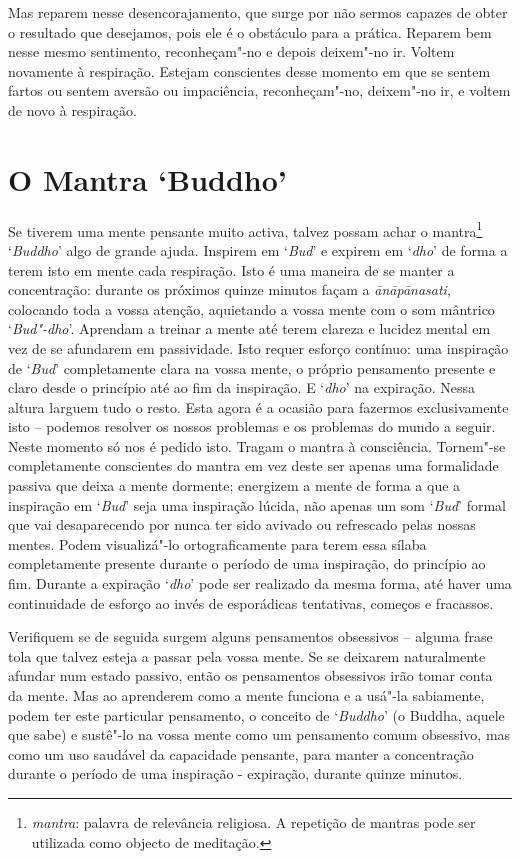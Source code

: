 Mas reparem nesse desencorajamento, que surge por não sermos capazes de
obter o resultado que desejamos, pois ele é o obstáculo para a prática.
Reparem bem nesse mesmo sentimento, reconheçam"-no e depois deixem"-no ir.
Voltem novamente à respiração. Estejam conscientes desse momento em que
se sentem fartos ou sentem aversão ou impaciência, reconheçam"-no,
deixem"-no ir, e voltem de novo à respiração.

\chapter{O Mantra `Buddho'}

Se tiverem uma mente pensante muito activa, talvez possam achar o
mantra\footnote{%
  \emph{mantra}: palavra de relevância religiosa. A repetição de mantras pode
  ser utilizada como objecto de meditação.}
`\emph{Buddho}' algo de grande ajuda. Inspirem em `\emph{Bud}' e
expirem em `\emph{dho}' de forma a terem isto em mente cada respiração. 
Isto é uma maneira de se manter a concentração: durante os próximos quinze
minutos façam a \emph{ānāpānasati}, colocando toda a vossa atenção,
aquietando a vossa mente com o som mântrico `\emph{Bud"-dho}'. Aprendam a
treinar a mente até terem clareza e lucidez mental em vez de se
afundarem em passividade. Isto requer esforço contínuo: uma inspiração de
`\emph{Bud}' completamente clara na vossa mente, o próprio pensamento
presente e claro desde o princípio até ao fim da inspiração. E
`\emph{dho}' na expiração. Nessa altura larguem tudo o resto. Esta agora
é a ocasião para fazermos exclusivamente isto -- podemos resolver os
nossos problemas e os problemas do mundo a seguir. Neste momento só nos
é pedido isto. Tragam o mantra à consciência. Tornem"-se completamente
conscientes do mantra em vez deste ser apenas uma formalidade passiva
que deixa a mente dormente; energizem a mente de forma a que a inspiração
em `\emph{Bud}' seja uma inspiração lúcida, não apenas um som `\emph{Bud}'
formal que vai desaparecendo por nunca ter sido avivado ou refrescado
pelas nossas mentes. Podem visualizá"-lo ortograficamente para terem essa
sílaba completamente presente durante o período de uma inspiração, do
princípio ao fim. Durante a expiração `\emph{dho}' pode ser realizado da
mesma forma, até haver uma continuidade de esforço ao invés de
esporádicas tentativas, começos e fracassos.

Verifiquem se de seguida surgem alguns pensamentos obsessivos -- alguma
frase tola que talvez esteja a passar pela vossa mente. Se se deixarem
naturalmente afundar num estado passivo, então os pensamentos obsessivos
irão tomar conta da mente. Mas ao aprenderem como a mente funciona e a
usá"-la sabiamente, podem ter este particular pensamento, o conceito de
`\emph{Buddho}' (o Buddha, aquele que sabe) e sustê"-lo na vossa mente
como um pensamento comum obsessivo, mas como um uso saudável da
capacidade pensante, para manter a concentração durante o período de uma
inspiração - expiração, durante quinze minutos.

